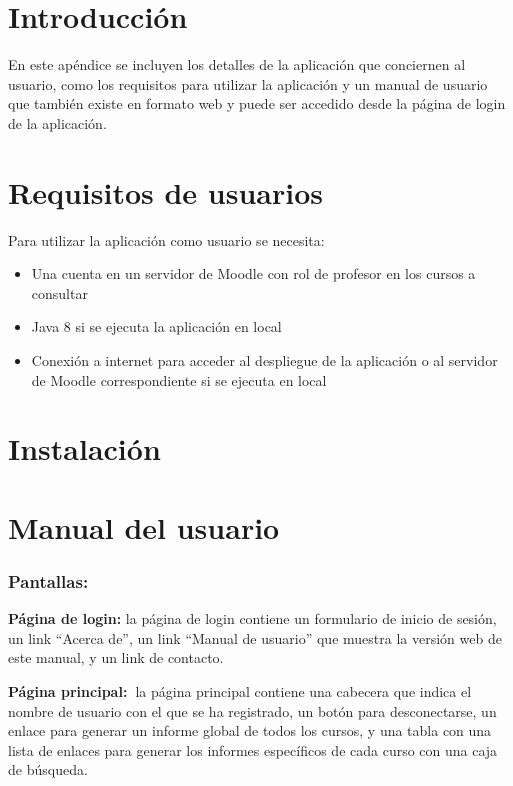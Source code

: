 
\section{Introducción}
En este apéndice se incluyen los detalles de la aplicación que conciernen al usuario, como los requisitos para utilizar la aplicación y un manual de usuario que también existe en formato web y puede ser accedido desde la página de login de la aplicación.
\section{Requisitos de usuarios}
Para utilizar la aplicación como usuario se necesita:
\begin{itemize}
	\item Una cuenta en un servidor de Moodle con rol de profesor en los cursos a consultar
	\item Java 8 si se ejecuta la aplicación en local
	\item Conexión a internet para acceder al despliegue de la aplicación o al servidor de Moodle correspondiente si se ejecuta en local
\end{itemize}
\section{Instalación}

\section{Manual del usuario}

\subsubsection{Pantallas:}

\textbf{Página de login:} la página de login contiene un formulario de
inicio de sesión, un link ``Acerca de'', un link ``Manual de usuario'' que
muestra la versión web de este manual, y un link de contacto.

\textbf{Página principal:~}la página principal contiene una cabecera que
indica el nombre de usuario con el que se ha registrado, un botón para
desconectarse, un enlace para generar un informe global de todos los
cursos, y una tabla con una lista de enlaces para generar los informes
específicos de cada curso con una caja de búsqueda.

